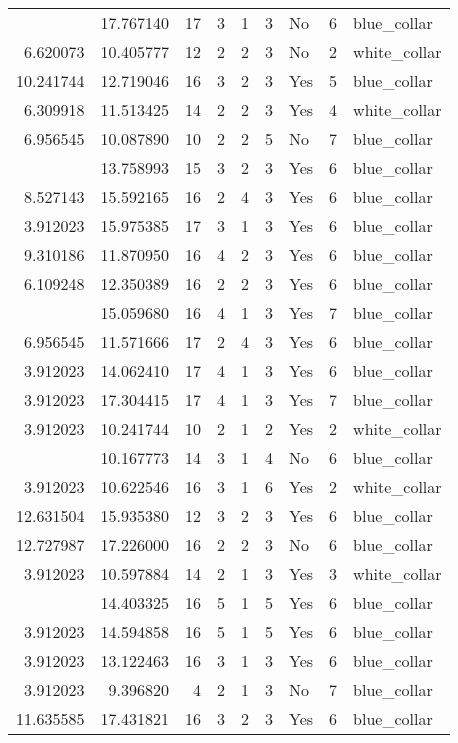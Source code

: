 \documentclass[
]{article}
\begin{document}
\begin{longtable}[t]{rrrrrllrl}
\addlinespace
3.912023 & 17.767140 & 17 & 3 & 1 & 3 & No & 6 & blue\_collar\\
6.620073 & 10.405777 & 12 & 2 & 2 & 3 & No & 2 & white\_collar\\
10.241744 & 12.719046 & 16 & 3 & 2 & 3 & Yes & 5 & blue\_collar\\
6.309918 & 11.513425 & 14 & 2 & 2 & 3 & Yes & 4 & white\_collar\\
6.956545 & 10.087890 & 10 & 2 & 2 & 5 & No & 7 & blue\_collar\\
\addlinespace
11.918724 & 13.758993 & 15 & 3 & 2 & 3 & Yes & 6 & blue\_collar\\
8.527143 & 15.592165 & 16 & 2 & 4 & 3 & Yes & 6 & blue\_collar\\
3.912023 & 15.975385 & 17 & 3 & 1 & 3 & Yes & 6 & blue\_collar\\
9.310186 & 11.870950 & 16 & 4 & 2 & 3 & Yes & 6 & blue\_collar\\
6.109248 & 12.350389 & 16 & 2 & 2 & 3 & Yes & 6 & blue\_collar\\
\addlinespace
3.912023 & 15.059680 & 16 & 4 & 1 & 3 & Yes & 7 & blue\_collar\\
6.956545 & 11.571666 & 17 & 2 & 4 & 3 & Yes & 6 & blue\_collar\\
3.912023 & 14.062410 & 17 & 4 & 1 & 3 & Yes & 6 & blue\_collar\\
3.912023 & 17.304415 & 17 & 4 & 1 & 3 & Yes & 7 & blue\_collar\\
3.912023 & 10.241744 & 10 & 2 & 1 & 2 & Yes & 2 & white\_collar\\
\addlinespace
3.912023 & 10.167773 & 14 & 3 & 1 & 4 & No & 6 & blue\_collar\\
3.912023 & 10.622546 & 16 & 3 & 1 & 6 & Yes & 2 & white\_collar\\
12.631504 & 15.935380 & 12 & 3 & 2 & 3 & Yes & 6 & blue\_collar\\
12.727987 & 17.226000 & 16 & 2 & 2 & 3 & No & 6 & blue\_collar\\
3.912023 & 10.597884 & 14 & 2 & 1 & 3 & Yes & 3 & white\_collar\\
\addlinespace
3.912023 & 14.403325 & 16 & 5 & 1 & 5 & Yes & 6 & blue\_collar\\
3.912023 & 14.594858 & 16 & 5 & 1 & 5 & Yes & 6 & blue\_collar\\
3.912023 & 13.122463 & 16 & 3 & 1 & 3 & Yes & 6 & blue\_collar\\
3.912023 & 9.396820 & 4 & 2 & 1 & 3 & No & 7 & blue\_collar\\
11.635585 & 17.431821 & 16 & 3 & 2 & 3 & Yes & 6 & blue\_collar\\

\end{longtable}
\end{document}
